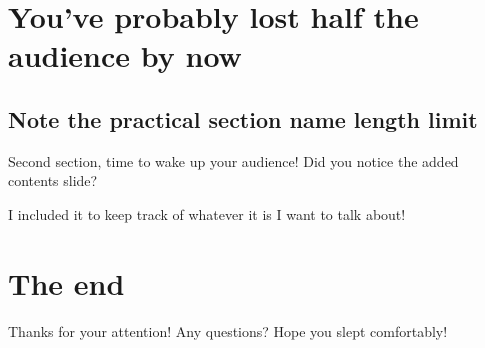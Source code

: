 \documentclass{beamer}
\begin{document}
\section{You've probably lost half the audience by now}
\subsection{Note the practical section name length limit}

\begin{frame}{Second section, time to wake up your audience!}
 Did you notice the added contents slide?

 I included it to keep track of whatever it is I want to talk about!
\end{frame}

\AtBeginSection[]{}%

\section{The end} %

\begin{frame}{Thanks for your attention! Any questions?}
 Hope you slept comfortably!
\end{frame}
\end{document}
